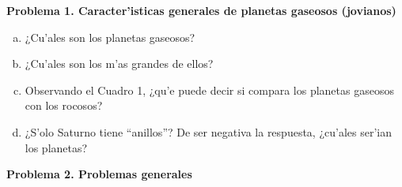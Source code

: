 \documentclass{article}
\begin{document}
\textbf{Problema 1. Caracter'isticas generales de planetas gaseosos (jovianos)}

\vspace{3mm}

\begin{enumerate}[a)] 

\item ¿Cu'ales son los planetas gaseosos?
\item ¿Cu'ales son los m'as grandes de ellos?
\item Observando el Cuadro 1, ¿qu'e puede decir si compara los planetas gaseosos con los rocosos?
\item ¿S'olo Saturno tiene ``anillos''? De ser negativa la respuesta, ¿cu'ales ser'ian los planetas?
\end{enumerate}

\vspace{3mm}

\textbf{Problema 2. Problemas generales}
\end{document}
